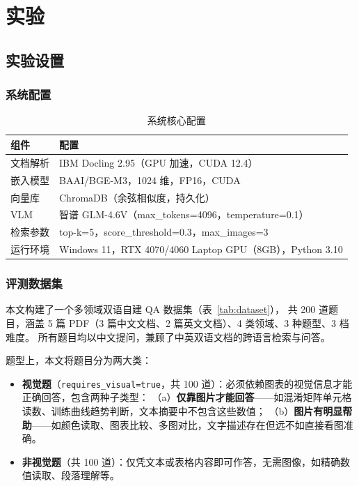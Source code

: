 ﻿\documentclass[UTF8, heading=true]{ctexart}
\begin{document}
\section{实验}

\subsection{实验设置}

\subsubsection{系统配置}

\begin{table}[H]
\centering
\caption{系统核心配置}
\begin{tabular}{ll}
\toprule
\textbf{组件} & \textbf{配置} \\
\midrule
文档解析 & IBM Docling 2.95（GPU 加速，CUDA 12.4）\\
嵌入模型 & BAAI/BGE-M3，1024 维，FP16，CUDA \\
向量库 & ChromaDB（余弦相似度，持久化）\\
VLM & 智谱 GLM-4.6V（max\_tokens=4096，temperature=0.1）\\
检索参数 & top-k=5，score\_threshold=0.3，max\_images=3 \\
运行环境 & Windows 11，RTX 4070/4060 Laptop GPU（8GB），Python 3.10 \\
\bottomrule
\end{tabular}
\label{tab:config}
\end{table}

\subsubsection{评测数据集}

本文构建了一个多领域双语自建 QA 数据集（表~\ref{tab:dataset}），
共 200 道题目，涵盖 5 篇 PDF（3 篇中文文档、2 篇英文文档）、4 类领域、3 种题型、3 档难度。
所有题目均以中文提问，兼顾了中英双语文档的跨语言检索与问答。

题型上，本文将题目分为两大类：
\begin{itemize}
    \item \textbf{视觉题}（\texttt{requires\_visual=true}，共 100 道）：必须依赖图表的视觉信息才能正确回答，包含两种子类型：
    （a）\textbf{仅靠图片才能回答}——如混淆矩阵单元格读数、训练曲线趋势判断，文本摘要中不包含这些数值；
    （b）\textbf{图片有明显帮助}——如颜色读取、图表比较、多图对比，文字描述存在但远不如直接看图准确。
    \item \textbf{非视觉题}（共 100 道）：仅凭文本或表格内容即可作答，无需图像，如精确数值读取、段落理解等。
\end{itemize}
\end{document}
